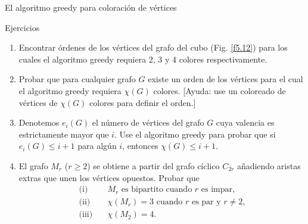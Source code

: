 \documentclass[11pt,spanish,makeidx]{amsbook}
\theoremstyle{definition}
\theoremstyle{remark}
\begin{document}
\begin{section}{El algoritmo greedy para coloración de vértices}
\begin{subsection}{Ejercicios}\label{ejercicio5.7} \begin{enumerate}
\item Encontrar órdenes de los vértices del grafo del cubo (Fig. \ref{f5.12}) para los cuales el algoritmo greedy requiera 2, 3 y 4 colores respectivamente.
\item \label{ejercicio5.7.2} Probar que para cualquier grafo $G$ existe un orden de los vértices para el cual el algoritmo greedy requiera $\chi(G)$ colores. [Ayuda: use un coloreado de vértices de $\chi(G)$ colores para definir el orden.]
\item Denotemos $e_i(G)$ el número de vértices del grafo $G$ cuya valencia es estrictamente mayor que $i$. Use el algoritmo greedy para probar que si $e_i(G) \le i+1$ para algún $i$, entonces $\chi(G) \le i+1$.
\item El grafo $M_r$ ($r\ge 2$) se obtiene a partir del grafo cíclico $C_{2r}$ añadiendo aristas extras que unen los vértices opuestos. Probar que
$$
\begin{aligned}
\text{(i)}\quad& \text{$M_r$ es bipartito cuando $r$ es impar,} \\
\text{(ii)}\quad&\text{$\chi(M_r)=3$ cuando $r$ es par y $r\not= 2$,} \\
\text{(iii)}\quad& \text{$\chi(M_2)=4$.}
\end{aligned}
$$
\end{enumerate}
\end{subsection}

\end{section}
\end{document}
